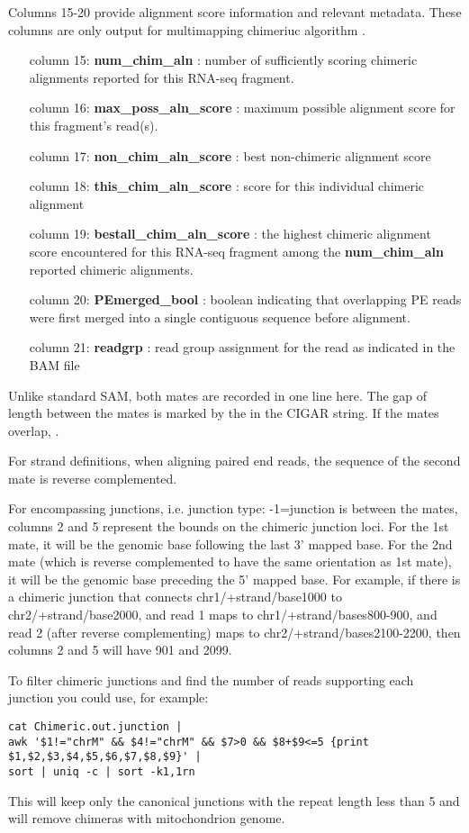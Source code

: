 \documentclass[12pt]{article}
\begin{document}
Columns 15-20 provide alignment score information and relevant metadata. These columns are only output for multimapping chimeriuc algorithm  .
\begin{itemize}[leftmargin=1in]
\item[column 15:] \textbf{num\_chim\_aln} : number of sufficiently scoring chimeric alignments reported for this RNA-seq fragment.
\item[column 16:] \textbf{max\_poss\_aln\_score} : maximum possible alignment score for this fragment's read(s).
\item[column 17:] \textbf{non\_chim\_aln\_score} : best non-chimeric alignment score
\item[column 18:] \textbf{this\_chim\_aln\_score} : score for this individual chimeric alignment
\item[column 19:] \textbf{bestall\_chim\_aln\_score} : the highest chimeric alignment score encountered for this RNA-seq fragment among the \textbf{num\_chim\_aln} reported chimeric alignments.
\item[column 20:] \textbf{PEmerged\_bool} : boolean indicating that overlapping PE reads were first merged into a single contiguous sequence before alignment.
\item[column 21:] \textbf{readgrp} : read group assignment for the read as indicated in the BAM file
\end{itemize}

Unlike standard SAM, both mates are recorded in one line here. The gap of length   between the mates is marked by the  in the CIGAR string.
If the mates overlap, .

For strand definitions, when aligning paired end reads, the sequence of the second mate is reverse complemented.

For encompassing junctions, i.e. junction type: -1=junction is between the mates, columns 2 and 5 represent the bounds on the chimeric junction loci. For the 1st mate, it will be the genomic base following the last 3' mapped base. For the 2nd mate (which is reverse complemented to have the same orientation as 1st mate), it will be the genomic base preceding the 5' mapped base. For example, if there is a chimeric junction that connects chr1/+strand/base1000 to chr2/+strand/base2000, and read 1 maps to chr1/+strand/bases800-900, and read 2 (after reverse complementing) maps to chr2/+strand/bases2100-2200, then columns 2 and 5 will have 901 and 2099.

To filter chimeric junctions and find the number of reads supporting each junction you could use, for example:
\begin{verbatim}
cat Chimeric.out.junction |
awk '$1!="chrM" && $4!="chrM" && $7>0 && $8+$9<=5 {print $1,$2,$3,$4,$5,$6,$7,$8,$9}' |
sort | uniq -c | sort -k1,1rn
\end{verbatim}
This will keep only the canonical junctions with the repeat length less than 5 and will remove chimeras with mitochondrion genome.
\end{document}
